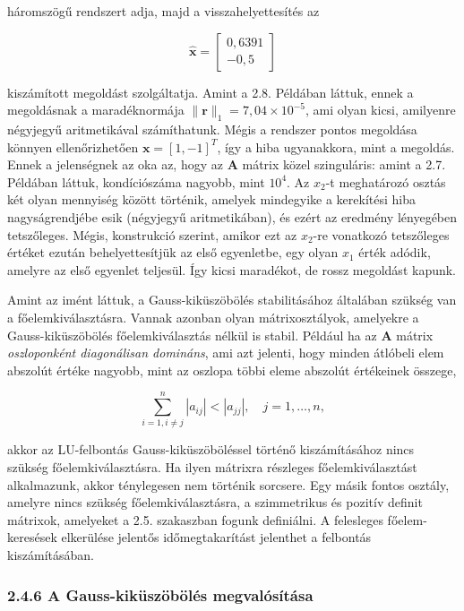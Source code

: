 \documentclass[
  magyar,
  11pt]{article}
\providecommand{\boldsymbol}[1]{\mathbf{#1}}
\begin{document}
háromszögű rendszert adja, majd a visszahelyettesítés az

\[\hat{\boldsymbol{x}} = \begin{bmatrix} 0{,}6391 \\ -0{,}5 \end{bmatrix}\]

kiszámított megoldást szolgáltatja. Amint a 2.8. Példában láttuk, ennek
a megoldásnak a maradéknormája
\(\|\boldsymbol{r}\|_1 = 7{,}04 \times 10^{-5}\), ami olyan kicsi,
amilyenre négyjegyű aritmetikával számíthatunk. Mégis a rendszer pontos
megoldása könnyen ellenőrizhetően \(\boldsymbol{x} = [1, -1]^T\), így a
hiba ugyanakkora, mint a megoldás. Ennek a jelenségnek az oka az, hogy
az \(\boldsymbol{A}\) mátrix közel szinguláris: amint a 2.7. Példában
láttuk, kondíciószáma nagyobb, mint \(10^4\). Az \(x_2\)-t meghatározó
osztás két olyan mennyiség között történik, amelyek mindegyike a
kerekítési hiba nagyságrendjébe esik (négyjegyű aritmetikában), és ezért
az eredmény lényegében tetszőleges. Mégis, konstrukció szerint, amikor
ezt az \(x_2\)-re vonatkozó tetszőleges értéket ezután behelyettesítjük
az első egyenletbe, egy olyan \(x_1\) érték adódik, amelyre az első
egyenlet teljesül. Így kicsi maradékot, de rossz megoldást kapunk.

Amint az imént láttuk, a Gauss-kiküszöbölés stabilitásához általában
szükség van a főelemkiválasztásra. Vannak azonban olyan mátrixosztályok,
amelyekre a Gauss-kiküszöbölés főelemkiválasztás nélkül is stabil.
Például ha az \(\boldsymbol{A}\) mátrix \emph{oszloponként diagonálisan
domináns}, ami azt jelenti, hogy minden átlóbeli elem abszolút értéke
nagyobb, mint az oszlopa többi eleme abszolút értékeinek összege,

\[\sum_{i=1, i \neq j}^{n} |a_{ij}| < |a_{jj}|, \quad j = 1, \dots, n,\]

akkor az LU-felbontás Gauss-kiküszöböléssel történő kiszámításához nincs
szükség főelemkiválasztásra. Ha ilyen mátrixra részleges
főelemkiválasztást alkalmazunk, akkor ténylegesen nem történik sorcsere.
Egy másik fontos osztály, amelyre nincs szükség főelemkiválasztásra, a
szimmetrikus és pozitív definit mátrixok, amelyeket a 2.5. szakaszban
fogunk definiálni. A felesleges főelem-keresések elkerülése jelentős
időmegtakarítást jelenthet a felbontás kiszámításában.

\subsubsection{2.4.6 A Gauss-kiküszöbölés
megvalósítása}\label{a-gauss-kikuxfcszuxf6buxf6luxe9s-megvaluxf3suxedtuxe1sa}
\end{document}
